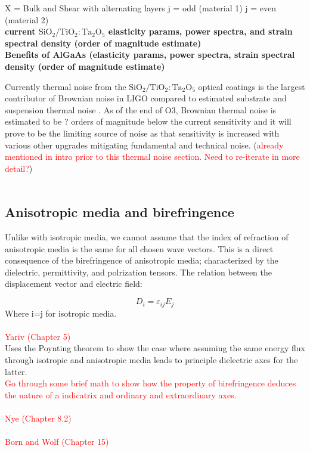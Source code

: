 X = Bulk and Shear
with alternating layers j = odd (material 1) j = even (material 2)
\\
\textbf{current $\mathrm{SiO_2}/\mathrm{TiO_2:Ta_2O_5}$ elasticity params, power spectra, and strain spectral density (order of magnitude estimate)} \cite{Harry:06}
\\
\noindent \textbf{Benefits of AlGaAs (elasticity params, power spectra, strain spectral density (order of magnitude estimate)} \cite{Cole:2013}

\noindent Currently thermal noise from the $\mathrm{SiO_2}/\mathrm{TiO_2:Ta_2O_5}$ optical coatings is the largest contributor of Brownian noise in LIGO compared to estimated substrate and suspension thermal noise \cite{Harry:06}. As of the end of O3, Brownian thermal noise is estimated to be ? orders of magnitude below the current sensitivity and it will prove to be the limiting source of noise as that sensitivity is increased with various other upgrades mitigating fundamental and technical noise. (\textcolor{red}{already mentioned in intro prior to this thermal noise section. Need to re-iterate in more detail?})
 \\
 \\


\subsection{Anisotropic media and birefringence}
Unlike with isotropic media, we cannot assume that the index of refraction of anisotropic media is the same for all chosen wave vectors. This is a direct consequence of the birefringence of anisotropic media; characterized by the dielectric, permittivity, and polrization tensors. The relation between the displacement vector and electric field:

\begin{equation}
D_i = \varepsilon_{ij}E_j
\end{equation}
Where i=j for isotropic media.
\\
\\
\textcolor{red}{Yariv (Chapter 5)}
\\
Uses the Poynting theorem to show the case where assuming the same energy flux through isotropic and anisotropic media leads to principle dielectric axes for the latter.
\\
\textcolor{red}{Go through some brief math to show how the property of birefringence deduces the nature of a indicatrix and ordinary and extraordinary axes. }\cite{yariv, nye}
\\
\\
\textcolor{red}{Nye (Chapter 8.2)}
\\
\\
\textcolor{red}{Born and Wolf (Chapter 15)}
\\
